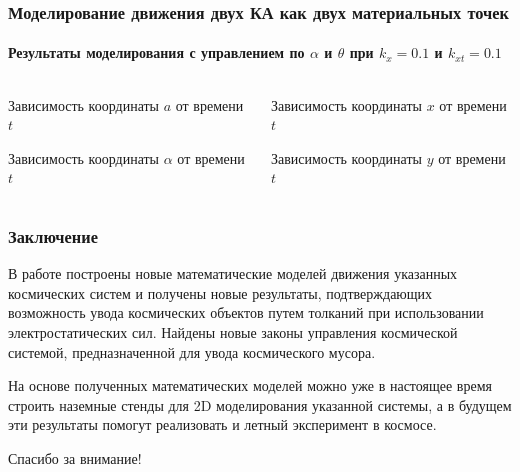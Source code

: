 \documentclass[10pt,pdf,hyperref={unicode}]{beamer}
\begin{document}
\begin{frame}
\frametitle{Моделирование движения двух КА как двух материальных точек}
\framesubtitle{Результаты моделирования с управлением по $\alpha$ и $\theta$ при $k_x = 0.1$ и $k_{x t} = 0.1$}
\begin{columns}[onlytextwidth]
	\begin{column}{0.5\textwidth}
		\begin{figure}[H]
		\end{figure}
		\scriptsize{Зависимость координаты $a$ от времени $t$}
		\begin{figure}[H]
		\end{figure} 
		\scriptsize{Зависимость координаты $\alpha$ от времени $t$}
	\end{column}
	\begin{column}{0.5\textwidth}
		\begin{figure}[H]
		\end{figure} 
		\scriptsize{Зависимость координаты $x$ от времени $t$}
		\begin{figure}[H]
		\end{figure} 
		\scriptsize{Зависимость координаты $y$ от времени $t$}
	\end{column}
\end{columns}
\end{frame}

\begin{frame}
\frametitle{Заключение}
В работе построены новые математические моделей движения указанных космических систем и получены новые результаты, подтверждающих возможность увода космических объектов путем толканий при использовании электростатических сил. Найдены новые законы управления космической системой, предназначенной для увода космического мусора.

На основе полученных математических моделей	 можно уже в настоящее время строить наземные стенды для 2D моделирования указанной системы, а в будущем эти результаты помогут реализовать и летный эксперимент в космосе.
\end{frame}

\begin{frame}
	\begin{center}
		Спасибо за внимание!
	\end{center}
\end{frame}
\end{document}
